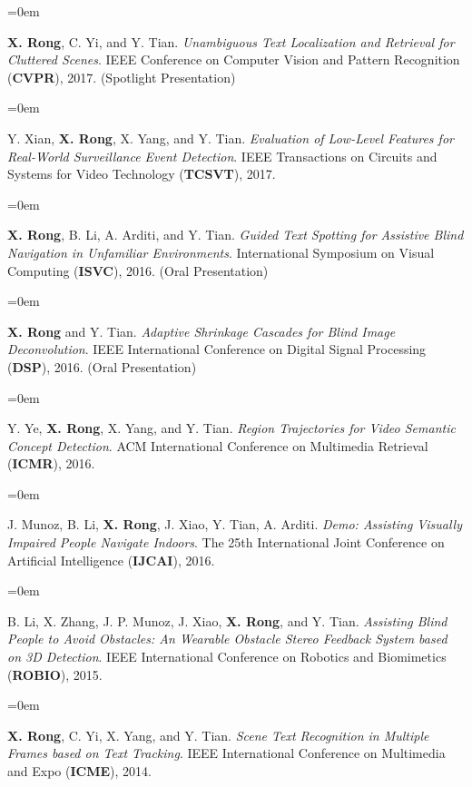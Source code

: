 \documentclass{scrartcl}
\newcommand{\Description}[1]{\hangindent=0em\hangafter=0\noindent\raggedright\footnotesize{#1}\par\normalsize\vspace{1em}} %
\begin{document}
\begin{cv}{}
\vspace{1.5em} %


\noindent{}\vspace{0.8em}

\Description{\textbf{X. Rong}, C. Yi, and Y. Tian. \textit{Unambiguous Text Localization and Retrieval for Cluttered Scenes}. IEEE Conference on Computer Vision and Pattern Recognition (\textbf{CVPR}), 2017. (Spotlight Presentation)}

\Description{Y. Xian, \textbf{X. Rong}, X. Yang, and Y. Tian. \textit{Evaluation of Low-Level Features for Real-World Surveillance Event Detection}. IEEE Transactions on Circuits and Systems for Video Technology (\textbf{TCSVT}), 2017.}

\Description{\textbf{X. Rong}, B. Li, A. Arditi, and Y. Tian. \textit{Guided Text Spotting for Assistive Blind Navigation in Unfamiliar Environments}. International Symposium on Visual Computing (\textbf{ISVC}), 2016. (Oral Presentation)}

\Description{\textbf{X. Rong} and Y. Tian. \textit{Adaptive Shrinkage Cascades for Blind Image Deconvolution}. IEEE International Conference on Digital Signal Processing (\textbf{DSP}), 2016. (Oral Presentation)}

\Description{Y. Ye, \textbf{X. Rong}, X. Yang, and Y. Tian. \textit{Region Trajectories for Video Semantic Concept Detection}. ACM International Conference on Multimedia Retrieval (\textbf{ICMR}), 2016.}

\Description{J. Munoz, B. Li, \textbf{X. Rong}, J. Xiao, Y. Tian, A. Arditi. \textit{Demo: Assisting Visually Impaired People Navigate Indoors}. The 25th International Joint Conference on Artificial Intelligence (\textbf{IJCAI}), 2016.}

\Description{B. Li, X. Zhang, J. P. Munoz, J. Xiao, \textbf{X. Rong}, and Y. Tian. \textit{Assisting Blind People to Avoid Obstacles: An Wearable Obstacle Stereo Feedback System based on 3D Detection}. IEEE International Conference on Robotics and Biomimetics (\textbf{ROBIO}), 2015.}

\Description{\textbf{X. Rong}, C. Yi, X. Yang, and Y. Tian. \textit{Scene Text Recognition in Multiple Frames based on Text Tracking}. IEEE International Conference on Multimedia and Expo (\textbf{ICME}), 2014.}


\end{cv}
\end{document}
